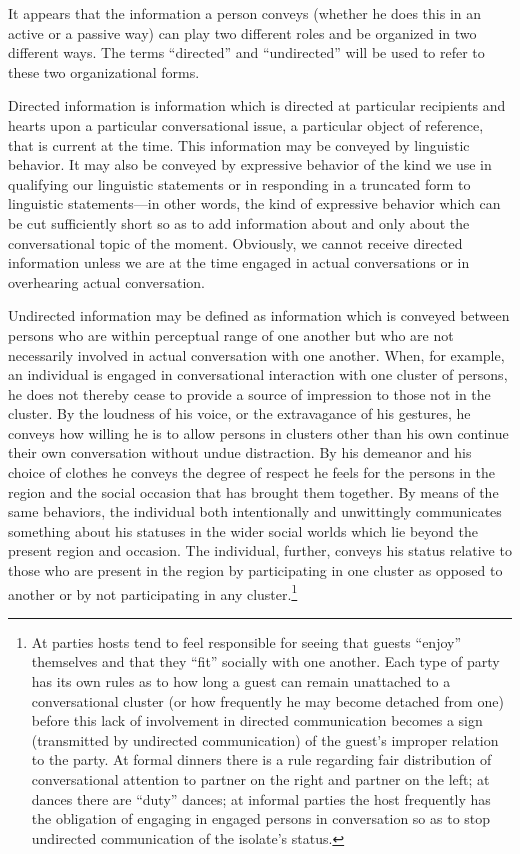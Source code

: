 \documentclass[twoside,symmetric,nobib,justified]{tufte-book}
\begin{document}
It appears that the information a person conveys (whether he does this
in an active or a passive way) can play two different roles and be
organized in two different ways. The terms ``directed'' and
``undirected'' will be used to refer to these two organizational forms.

Directed information is information which is directed at particular
recipients and hearts upon a particular conversational issue, a
particular object of reference, that is current at the time. This
information may be conveyed by linguistic behavior. It may also be
conveyed by expressive behavior of the kind we use in qualifying our
linguistic statements or in responding in a truncated form to linguistic
statements---in other words, the kind of expressive behavior which can
be cut sufficiently short so as to add information about and only about
the conversational topic of the moment. Obviously, we cannot receive
directed information unless we are at the time engaged in actual
conversations or in overhearing actual conversation.

Undirected information may be defined as information which is conveyed
between persons who are within perceptual range of one another but who
are not necessarily involved in actual conversation with one another.
When, for example, an individual is engaged in conversational
interaction with one cluster of persons, he does not thereby cease to
provide a source of impression to those not in the cluster. By the
loudness of his voice, or the extravagance of his gestures, he conveys
how willing he is to allow persons in clusters other than his own
continue their own conversation without undue distraction. By his
demeanor and his choice of clothes he conveys the degree of respect he
feels for the persons in the region and the social occasion that has
brought them together. By means of the same behaviors, the individual
both intentionally and unwittingly communicates something about his
statuses in the wider social worlds which lie beyond the present region
and occasion. The individual, further, conveys his status relative to
those who are present in the region by participating in one cluster as
opposed to another or by not participating in any cluster.\footnote{At
  parties hosts tend to feel responsible for seeing that guests
  ``enjoy'' themselves and that they ``fit'' socially with one another.
  Each type of party has its own rules as to how long a guest can remain
  unattached to a conversational cluster (or how frequently he may
  become detached from one) before this lack of involvement in directed
  communication becomes a sign (transmitted by undirected communication)
  of the guest's improper relation to the party. At formal dinners there
  is a rule regarding fair distribution of conversational attention to
  partner on the right and partner on the left; at dances there are
  ``duty'' dances; at informal parties the host frequently has the
  obligation of engaging in engaged persons in conversation so as to
  stop undirected communication of the isolate's status.}
\end{document}
